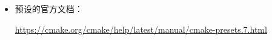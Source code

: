 
\begin{itemize}
\item
预设的官方文档：

\url{https://cmake.org/cmake/help/latest/manual/cmake-presets.7.html}
\end{itemize}